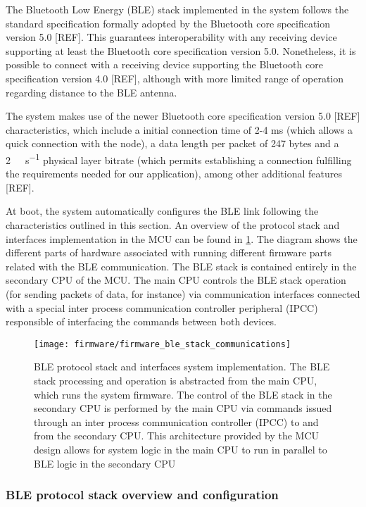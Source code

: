 The Bluetooth Low Energy (BLE) stack implemented in the system follows the standard specification formally adopted by the Bluetooth core specification version 5.0 [REF]. This guarantees interoperability with any receiving device supporting at least the Bluetooth core specification version 5.0. Nonetheless, it is possible to connect with a receiving device supporting the Bluetooth core specification version 4.0 [REF], although with more limited range of operation regarding distance to the BLE antenna.

The system makes use of the newer Bluetooth core specification version 5.0 [REF] characteristics, which include a initial connection time of 2-4 ms (which allows a quick connection with the node), a data length per packet of 247 bytes and a \SI{2}{\mega\bit\per\second} physical layer bitrate (which permits establishing a connection fulfilling the requirements needed for our application), among other additional features [REF].

At boot, the system automatically configures the BLE link following the characteristics outlined in this section. An overview of the protocol stack and interfaces implementation in the MCU can be found in \cref{fig:firmware_ble_stack_communications}. The diagram shows the different parts of hardware associated with running different firmware parts related with the BLE communication. The BLE stack is contained entirely in the secondary CPU of the MCU. The main CPU controls the BLE stack operation (for sending packets of data, for instance) via communication interfaces connected with a special inter process communication controller peripheral (IPCC) responsible of interfacing the commands between both devices. %

\begin{figure}[ht]
	\centering
	\texttt{[image: firmware/firmware\_ble\_stack\_communications]}
	\caption{BLE protocol stack and interfaces system implementation. The BLE stack processing and operation is abstracted from the main CPU, which runs the system firmware. The control of the BLE stack in the secondary CPU is performed by the main CPU via commands issued through an inter process communication controller (IPCC) to and from the secondary CPU. This architecture provided by the MCU design allows for system logic in the main CPU to run in parallel to BLE logic in the secondary CPU}
	\label{fig:firmware_ble_stack_communications}
\end{figure}

\subsubsection{BLE protocol stack overview and configuration} \label{sec:ble_stack}

